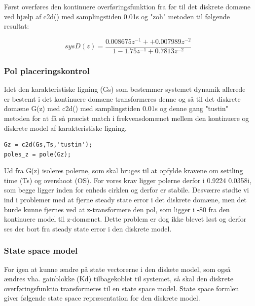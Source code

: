 Først overføres den kontinuere overføringsfunktion fra før til det diskrete domæne ved hjælp af c2d() med samplingstiden 0.01s og "zoh" metoden til følgende resultat:

\begin{equation}
sysD(z) = \frac{0.008675 z^{-1} + + 0.007989 z^{-2}}{1 - 1.75 z^{-1} + 0.7813 z^{-2}}
\end{equation}

\subsubsection{Pol placeringskontrol}
Idet den karakteristiske ligning (Gs) som bestemmer systemet dynamik allerede er bestemt i det kontinuere domæne  transformeres denne og så til det diskrete domæne G(z) med c2d() med samplingstiden 0.01s og denne gang "tustin" metoden for at få så præcist match i frekvensdomænet mellem den kontinuere og diskrete model af karakteristiske ligning. 

\begin{lstlisting}[frame=single]
Gz = c2d(Gs,Ts,'tustin');
poles_z = pole(Gz);
\end{lstlisting}

Ud fra G(z) isoleres polerne, som skal bruges til at opfylde kravene om settling time (Ts) og overshoot (OS). For vores krav ligger polerne  derfor i 0.9224 \textpm0.0358i, som begge ligger inden for enheds cirklen og derfor er stabile.  
Desværre stødte vi ind i problemer med at fjerne steady state error i det diskrete domæne, men det burde kunne fjernes ved at z-transformere den pol, som ligger i -80 fra den kontinuere model til z-domænet. Dette problem er dog ikke blevet løst og derfor ses der bort fra steady state error i den diskrete model.

\subsubsection{State space model}

 For igen at kunne ændre på state vectorerne i den diskete model, som også ændres vha. gainblokke (Kd) tilbagekoblet til systemet, så skal den diskrete overføringsfunktio transformeres til en state space model. State space formlen giver følgende state space repræsentation for den  diskrete model.

